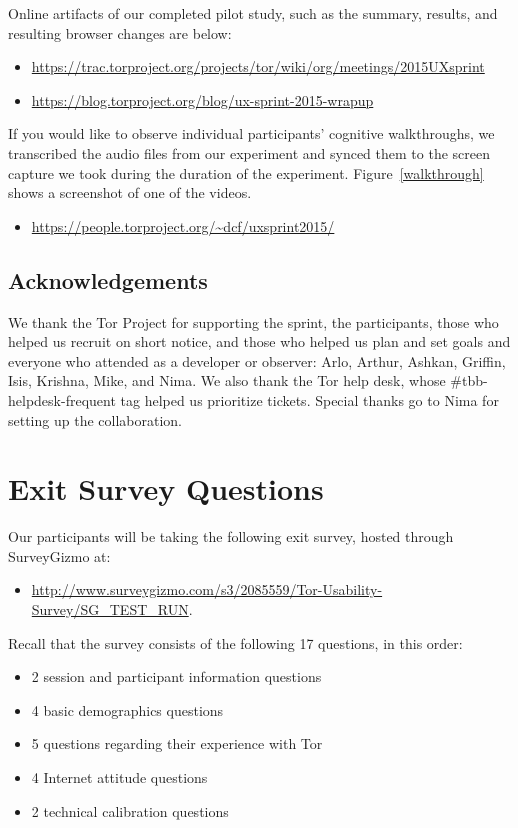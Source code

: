 \documentclass[letterpaper,twocolumn,11pt]{article}
\begin{document}
\indent \indent  Online artifacts of our completed pilot study, such as 
the summary, results, and resulting browser changes are below:
\begin{itemize} \itemsep1pt \parskip0pt 
\item \url{https://trac.torproject.org/projects/tor/wiki/org/meetings/2015UXsprint}
\item \url{https://blog.torproject.org/blog/ux-sprint-2015-wrapup}
\end{itemize}

\noindent If you would like to observe individual participants' cognitive walkthroughs, 
we transcribed the audio files from our experiment
and synced them to the screen capture we took during the duration of the experiment.
Figure~\ref{walkthrough} shows a screenshot of one of the videos.
\begin{itemize} \itemsep1pt \parskip0pt 
\item \url{https://people.torproject.org/~dcf/uxsprint2015/}
\end{itemize}

\subsection{Acknowledgements}
\indent \indent We thank the Tor Project for supporting the sprint, the participants, those who helped us recruit on short notice, and those who helped us plan and set goals and everyone who attended as a developer or observer: Arlo, Arthur, Ashkan, Griffin, Isis, Krishna, Mike, and Nima. We also thank the Tor help desk, whose \#tbb-helpdesk-frequent tag helped us prioritize tickets. Special thanks go to Nima for setting up the collaboration.

\section{Exit Survey Questions}
\label{sec:survey} 
\indent \indent Our participants will be taking the following exit survey, hosted through
SurveyGizmo at: 
\begin{itemize} \itemsep1pt \parskip0pt 
\item \url{http://www.surveygizmo.com/s3/2085559/Tor-Usability-Survey/SG_TEST_RUN}.
\end{itemize}

\noindent Recall that the survey consists of the following 17 questions, in this order: 
\begin{itemize} \itemsep1pt \parskip0pt 
\item 2 session and participant information questions
\item 4 basic demographics questions
\item 5 questions regarding their experience with Tor
\item 4 Internet attitude questions
\item 2 technical calibration questions
\end{itemize}
\end{document}
